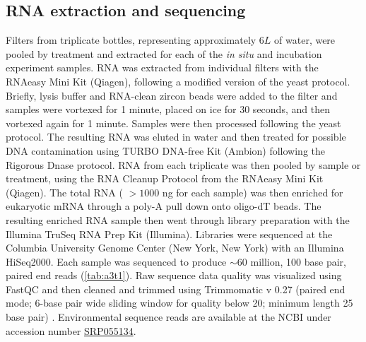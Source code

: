 \subsection{RNA extraction and sequencing}
Filters from triplicate bottles, representing approximately $6L$ of water, were pooled by treatment and extracted for each of the \textit{in situ} and incubation experiment samples. RNA was extracted from individual filters with the RNAeasy Mini Kit (Qiagen), following a modified version of the yeast protocol. Briefly, lysis buffer and RNA-clean zircon beads were added to the filter and samples were vortexed for 1 minute, placed on ice for 30 seconds, and then vortexed again for 1 minute. Samples were then processed following the yeast protocol. The resulting RNA was eluted in water and then treated for possible DNA contamination using TURBO DNA-free Kit (Ambion) following the Rigorous Dnase protocol. RNA from each triplicate was then pooled by sample or treatment, using the RNA Cleanup Protocol from the RNAeasy Mini Kit (Qiagen). The total RNA ( $>1000$ ng for each sample) was then enriched for eukaryotic mRNA through a poly-A pull down onto oligo-dT beads. The resulting enriched RNA sample then went through library preparation with the Illumina TruSeq RNA Prep Kit (Illumina). Libraries were sequenced at the Columbia University Genome Center (New York, New York) with an Illumina HiSeq2000. Each sample was sequenced to produce $\sim 60$ million, 100 base pair, paired end reads (\cref{tab:a3t1}). Raw sequence data quality was visualized using FastQC \citep{Andrewsa} and then cleaned and trimmed using Trimmomatic v 0.27 (paired end mode; 6-base pair wide sliding window for quality below 20; minimum length 25 base pair) \citep{Lohse2012}. Environmental sequence reads are available at the NCBI under accession number \href{http://www.ncbi.nlm.nih.gov/sra/?term=SRP055134}{SRP055134}. 

